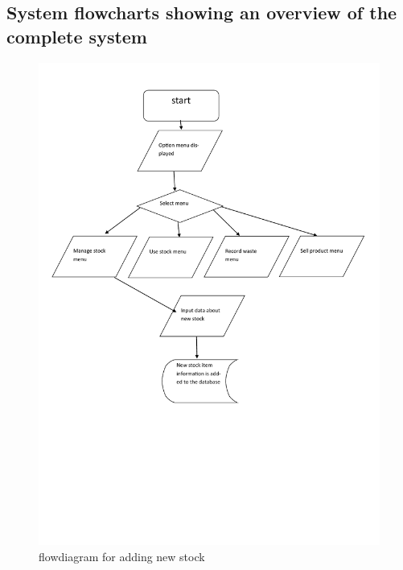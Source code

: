 \subsection{System flowcharts showing an overview of the complete system}

\begin{figure}[H]
    \includegraphics[width=\textwidth]{./Design/pdfimages/flowdiagram_new_stock.pdf}
    \caption{flowdiagram for adding new stock} \label{fig:new stock flowchart}
\end{figure}



